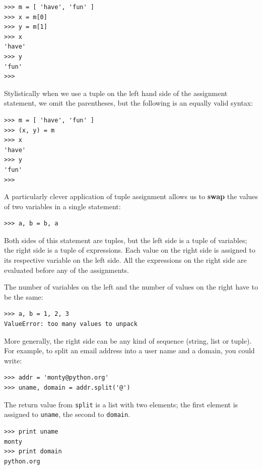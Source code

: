 \documentclass[10pt]{book}
\begin{document}
\beforeverb
\begin{verbatim}
>>> m = [ 'have', 'fun' ]
>>> x = m[0]
>>> y = m[1]
>>> x
'have'
>>> y
'fun'
>>> 
\end{verbatim}
\afterverb

Stylistically when we use a tuple on the left hand side of the assignment
statement, we omit the parentheses, but the following is an equally 
valid syntax:

\beforeverb
\begin{verbatim}
>>> m = [ 'have', 'fun' ]
>>> (x, y) = m
>>> x
'have'
>>> y
'fun'
>>> 
\end{verbatim}
\afterverb
%
A particularly clever application of tuple assignment allows
us to {\bf swap} the values of two variables in a single statement:

\beforeverb
\begin{verbatim}
>>> a, b = b, a
\end{verbatim}
\afterverb
%
Both sides of this statement are tuples, but
the left side is a tuple of variables; the right side is a tuple of
expressions.  Each value on the right side 
is assigned to its respective variable on the left side.  
All the expressions on the right side are evaluated before any
of the assignments.

The number of variables on the left and the number of
values on the right have to be the same:


\beforeverb
\begin{verbatim}
>>> a, b = 1, 2, 3
ValueError: too many values to unpack
\end{verbatim}
\afterverb
%
More generally, the right side can be any kind of sequence
(string, list or tuple).  For example, to split an email address
into a user name and a domain, you could write:


\beforeverb
\begin{verbatim}
>>> addr = 'monty@python.org'
>>> uname, domain = addr.split('@')
\end{verbatim}
\afterverb
%
The return value from {\tt split} is a list with two elements;
the first element is assigned to {\tt uname}, the second to
{\tt domain}.

\beforeverb
\begin{verbatim}
>>> print uname
monty
>>> print domain
python.org
\end{verbatim}
\afterverb
%
\end{document}
